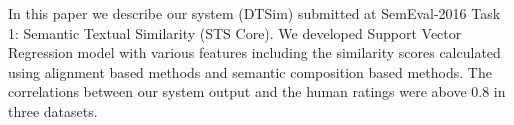 In this paper we describe our system (DTSim) submitted at SemEval-2016 Task 1: Semantic Textual Similarity (STS Core). We developed Support Vector Regression model with various features including the similarity scores calculated using alignment based methods and semantic composition based methods. The correlations between our system output and the human ratings were above 0.8 in three datasets.
